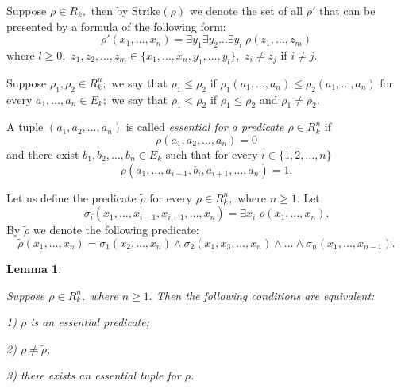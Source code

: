 \documentclass{au}
\theoremstyle{plain}
\newtheorem{lemma}{Lemma}
\theoremstyle{definition}
\theoremstyle{remark}
\numberwithin{equation}{section}
\begin{document}
Suppose $\rho \in R_{k},$ then by ${
\mathrm{Strike}
}(\rho)$ we denote the set of all $\rho'$ that
can be presented by
a formula of the following form:
$$\rho' (x_{1},\ldots,x_{n}) = \exists y_{1} \exists y_{2}\ldots  \exists y_{l} \; \rho(z_{1},\ldots,z_{m})$$
where $l\ge 0,$ $z_{1},z_{2},\ldots,z_{m} \in \{x_{1},\ldots,x_{n},y_{1},\ldots,y_{l}\},$
$z_{i}\neq z_{j}$ if $i\neq j.$

Suppose $\rho_{1},\rho_{2}\in R_{k}^{n};$ we say that $\rho_{1}\le \rho_{2}$
if $\rho_{1}(a_{1},\ldots,a_{n})\le \rho_{2}(a_{1},\ldots,a_{n})$ for every
$a_{1},\ldots,a_{n}\in E_{k};$
we say that $\rho_{1}<\rho_{2}$ if $\rho_{1}\le \rho_{2}$ and $\rho_{1}\neq \rho_{2}.$

A tuple $(a_{1},a_{2},\ldots,a_{n})$ is called \textit{essential for a predicate $\rho\in R_{k}^{n}$}
if $$\rho(a_{1},a_{2},\ldots,a_{n})=0$$ and
there exist $b_{1},b_{2},\ldots,b_{n}\in E_{k}$ such that for every $i\in \{1,2,\ldots,n\}$
$$\rho(a_{1},\ldots,a_{i-1},b_{i},a_{i+1},\ldots,a_{n})=1.$$

Let us  define the predicate $\widetilde \rho$
for every $\rho\in R_{k}^{n},$  where $n\ge 1.$
Let 
$$\sigma_{i}(x_{1},\ldots,x_{i-1},x_{i+1},\ldots,x_{n}) = \exists x_{i}\; \rho(x_{1},\ldots,x_{n}).$$
By $\widetilde \rho$ we denote the following predicate:
$$\widetilde \rho(x_{1},\ldots,x_{n}) =
\sigma_{1}(x_{2},\ldots,x_{n})
\wedge\sigma_{2}(x_{1},x_{3},\ldots,x_{n})
\wedge \ldots\wedge \sigma_{n}(x_{1},\ldots,x_{n-1}).$$

\begin{lemma}\label{sushnabor}

Suppose $\rho \in R_{k}^{n},$ where $n\ge 1.$ Then the following conditions are equivalent:

1) $\rho$ is an essential predicate;

2) $\rho \neq \widetilde \rho;$

3) there exists an essential tuple for $\rho$.

\end{lemma}
\end{document}
